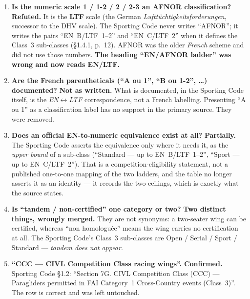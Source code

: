\documentclass[11pt,a4paper]{article}
\newcommand{\verdict}[1]{\textbf{\textcolor{vbad}{#1}}}
\newcommand{\ok}[1]{\textbf{\textcolor{vgood}{#1}}}
\begin{document}
\begin{enumerate}[leftmargin=1.4em, itemsep=0.5em]

\item \textbf{Is the numeric scale 1 / 1-2 / 2 / 2-3 an AFNOR classification?}
  \verdict{Refuted.} It is the \textbf{LTF} scale (the German
  \emph{Lufttüchtigkeitsforderungen}, successor to the DHV scale). The Sporting Code never
  writes \enquote{AFNOR}; it writes the pairs \enquote{EN~B/LTF~1--2} and
  \enquote{EN~C/LTF~2} when it defines the Class~3 sub-classes (\S1.4.1, p.~12). AFNOR was
  the older \emph{French} scheme and did not use those numbers.
  \textbf{The heading \enquote{EN/AFNOR ladder} was wrong and now reads EN/LTF.}

\item \textbf{Are the French parentheticals (\enquote{A ou 1}, \enquote{B ou 1-2}, \dots)
  documented?} \verdict{Not as written.} What is documented, in the Sporting Code itself,
  is the \emph{EN$\leftrightarrow$LTF} correspondence, not a French labelling. Presenting
  \enquote{A ou 1} as a classification label has no support in the primary source. They
  were removed.

\item \textbf{Does an official EN-to-numeric equivalence exist at all?}
  \textbf{Partially.} The Sporting Code asserts the equivalence only where it needs it, as
  the \emph{upper bound} of a sub-class (\enquote{Standard --- up to EN~B/LTF~1--2},
  \enquote{Sport --- up to EN~C/LTF~2}). That is a competition-eligibility statement, not a
  published one-to-one mapping of the two ladders, and the table no longer asserts it as an
  identity --- it records the two ceilings, which is exactly what the source states.

\item \textbf{Is \enquote{tandem / non-certified} one category or two?}
  \verdict{Two distinct things, wrongly merged.} They are not synonyms: a two-seater wing
  can be certified, whereas \enquote{non homologuée} means the wing carries no
  certification at all. The Sporting Code's Class~3 sub-classes are Open / Serial / Sport /
  Standard --- \emph{tandem does not appear}.

\item \textbf{\enquote{CCC --- CIVL Competition Class racing wings}.} \ok{Confirmed.}
  Sporting Code \S1.2: \enquote{Section 7G. CIVL Competition Class (CCC) --- Paragliders
  permitted in FAI Category~1 Cross-Country events (Class~3)}. The row is correct and was
  left untouched.


\end{enumerate}
\end{document}
